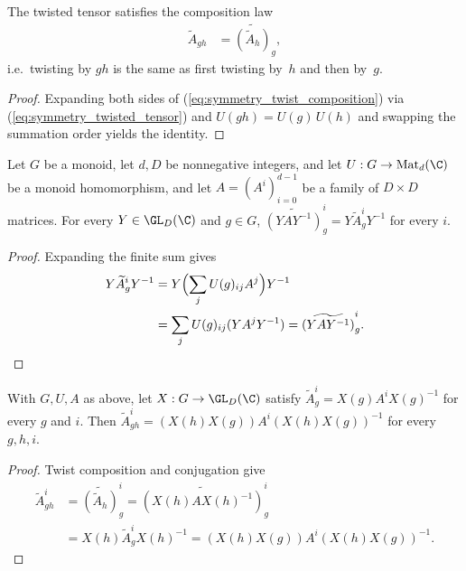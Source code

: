 \begin{lemma}\label{lem:twisted_tensor_mul}
    \leanok
    The twisted tensor satisfies the composition law
    \begin{align}
        \widetilde{A}_{gh}
         & =\widetilde{(\widetilde{A}_h)}_g,
        \label{eq:symmetry_twist_composition}
    \end{align}
    i.e.\ twisting by $gh$ is the same as first twisting by~$h$
    and then by~$g$.
\end{lemma}

\begin{proof}\leanok{}
    Expanding both sides of (\ref{eq:symmetry_twist_composition}) via
    (\ref{eq:symmetry_twisted_tensor}) and $U(gh)=U(g)\,U(h)$ and swapping
    the summation order yields the identity.
\end{proof}

\begin{lemma}\label{lem:twisted_tensor_gauge_conjugation}
    \leanok
    Let $G$ be a monoid, let $d,D$ be nonnegative integers, and let
    $U:G\to\operatorname{Mat}_d(\C)$ be a monoid homomorphism, and let
    $A=(A^i)_{i=0}^{d-1}$ be a family of $D\times D$ matrices. For every
    $Y\in\GL_D(\C)$ and $g\in G$,
    $\widetilde{(YAY^{-1})}_g^i=Y\widetilde A_g^iY^{-1}$ for every $i$.
\end{lemma}
\begin{proof}\leanok
    Expanding the finite sum gives
    \begin{align*}
        Y\widetilde A_g^iY^{-1}
         & =Y\Bigl(\sum_j U(g)_{ij}A^j\Bigr)Y^{-1} \\
         & =\sum_j U(g)_{ij}(YA^jY^{-1})
        =\widetilde{(YAY^{-1})}_g^i.
    \end{align*}
\end{proof}

\begin{lemma}\label{lem:symmetry_gauge_product_intertwines}
    \leanok
    With $G,U,A$ as above, let $X:G\to\GL_D(\C)$ satisfy
    $\widetilde A_g^i=X(g)A^iX(g)^{-1}$ for every $g$ and $i$. Then
    $\widetilde A_{gh}^i=(X(h)X(g))A^i(X(h)X(g))^{-1}$ for every $g,h,i$.
\end{lemma}
\begin{proof}\leanok
    Twist composition and conjugation give
    \begin{align*}
        \widetilde A_{gh}^i
         & =\widetilde{(\widetilde A_h)}_g^i
        =\widetilde{(X(h)AX(h)^{-1})}_g^i    \\
         & =X(h)\widetilde A_g^iX(h)^{-1}
        =(X(h)X(g))A^i(X(h)X(g))^{-1}.
    \end{align*}
\end{proof}


